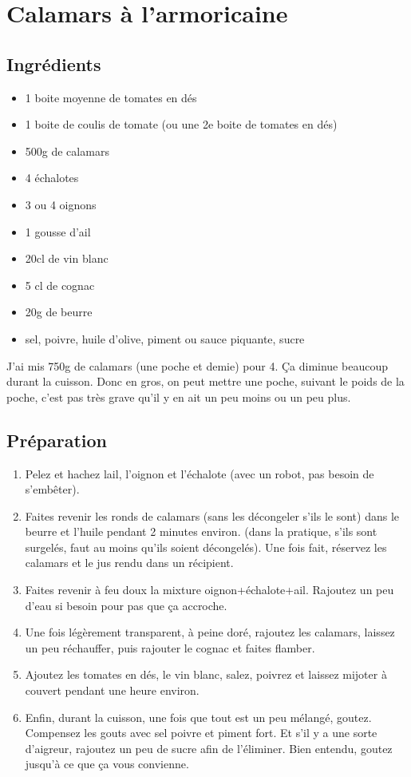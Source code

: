 \newpage
\section{Calamars à l'armoricaine}
\subsection*{Ingrédients}
\begin{itemize}
\item 1 boite moyenne de tomates en dés
\item 1 boite de coulis de tomate (ou une 2e boite de tomates en dés)
\item 500g de calamars
\item 4 échalotes
\item 3 ou 4 oignons
\item 1 gousse d'ail
\item 20cl de vin blanc
\item 5 cl de cognac
\item 20g de beurre
\item sel, poivre, huile d'olive, piment ou sauce piquante, sucre
\end{itemize}

\begin{remarque}
J'ai mis 750g de calamars (une poche et demie) pour 4. Ça diminue beaucoup durant la cuisson. Donc en gros, on peut mettre une poche, suivant le poids de la poche, c'est pas très grave qu'il y en ait un peu moins ou un peu plus.
\end{remarque}


\subsection*{Préparation}
\begin{enumerate}
\item Pelez et hachez lail, l'oignon et l'échalote (avec un robot, pas besoin de s'embêter).
\item Faites revenir les ronds de calamars (sans les décongeler s'ils le sont) dans le beurre et l'huile pendant 2 minutes environ. (dans la pratique, s'ils sont surgelés, faut au moins qu'ils soient décongelés). Une fois fait, réservez les calamars et le jus rendu dans un récipient.
\item Faites revenir à feu doux la mixture oignon+échalote+ail. Rajoutez un peu d'eau si besoin pour pas que ça accroche.
\item Une fois légèrement transparent, à peine doré, rajoutez les calamars, laissez un peu réchauffer, puis rajouter le cognac et faites flamber.
\item Ajoutez les tomates en dés, le vin blanc, salez, poivrez et laissez mijoter à couvert pendant une heure environ.
\item Enfin, durant la cuisson, une fois que tout est un peu mélangé, goutez. Compensez les gouts avec sel poivre et piment fort. Et s'il y a une sorte d'aigreur, rajoutez un peu de sucre afin de l'éliminer. Bien entendu, goutez jusqu'à ce que ça vous convienne.
\end{enumerate}

